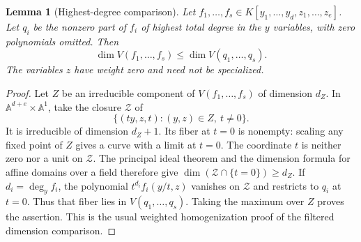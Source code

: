 \documentclass[10pt,a4paper]{amsart}
\newtheorem{lemma}[theorem]{Lemma}
\newcommand{\A}{\mathbb A}
\newcommand{\kk}{K}
\begin{document}
\begin{lemma}[Highest-degree comparison]\label{lem:dimension}
Let $f_1,\ldots,f_s\in\kk[y_1,\ldots,y_d,z_1,\ldots,z_e]$.
Let $q_i$ be the nonzero part of $f_i$ of highest total degree in the
$y$ variables, with zero polynomials omitted. Then
\[
 \dim V(f_1,\ldots,f_s)\leq\dim V(q_1,\ldots,q_s).
\]
The variables $z$ have weight zero and need not be specialized.
\end{lemma}

\begin{proof}
Let $Z$ be an irreducible component of $V(f_1,\ldots,f_s)$ of
dimension $d_Z$. In $\A^{d+e}\times\A^1$, take the closure $\mathcal Z$
of
\[
 \{(t y,z,t):(y,z)\in Z,\ t\neq0\}.
\]
It is irreducible of dimension $d_Z+1$. Its fiber at $t=0$ is nonempty:
scaling any fixed point of $Z$ gives a curve with a limit at $t=0$.
The coordinate $t$ is neither zero nor a unit on $\mathcal Z$.
The principal ideal theorem and the dimension formula for affine
domains over a field therefore give
$\dim(\mathcal Z\cap\{t=0\})\geq d_Z$.
If $d_i=\deg_y f_i$, the polynomial
$t^{d_i}f_i(y/t,z)$ vanishes on $\mathcal Z$ and restricts to $q_i$
at $t=0$. Thus that fiber lies in $V(q_1,\ldots,q_s)$.
Taking the maximum over $Z$ proves the assertion. This is the usual
weighted homogenization proof of the filtered dimension comparison.
\end{proof}
\end{document}
